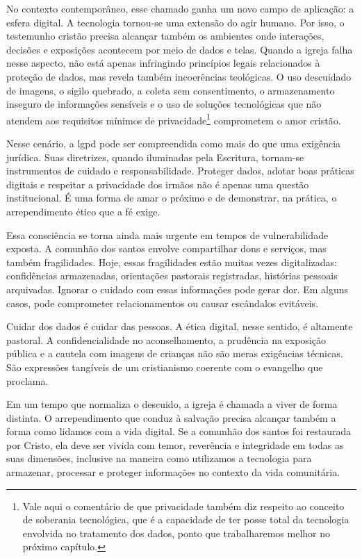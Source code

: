 No contexto contemporâneo, esse chamado ganha um novo campo de aplicação: a esfera digital. A tecnologia tornou-se uma extensão do agir humano. Por isso, o testemunho cristão precisa alcançar também os ambientes onde interações, decisões e exposições acontecem por meio de dados e telas. Quando a igreja falha nesse aspecto, não está apenas infringindo princípios legais relacionados à proteção de dados, mas revela também incoerências teológicas. O uso descuidado de imagens, o sigilo quebrado, a coleta sem consentimento, o armazenamento inseguro de informações sensíveis e o uso de soluções tecnológicas que não atendem aos requisitos mínimos de privacidade\footnote{Vale aqui o comentário de que privacidade também diz respeito ao conceito de soberania tecnológica, que é a capacidade de ter posse total da tecnologia envolvida no tratamento dos dados, ponto que trabalharemos melhor no próximo capítulo.} comprometem o amor cristão.

Nesse cenário, a \gls{lgpd} pode ser compreendida como mais do que uma exigência jurídica. Suas diretrizes, quando iluminadas pela Escritura, tornam-se instrumentos de cuidado e responsabilidade. Proteger dados, adotar boas práticas digitais e respeitar a privacidade dos irmãos não é apenas uma questão institucional. É uma forma de amar o próximo e de demonstrar, na prática, o arrependimento ético que a fé exige.

Essa consciência se torna ainda mais urgente em tempos de vulnerabilidade exposta. A comunhão dos santos envolve compartilhar dons e serviços, mas também fragilidades. Hoje, essas fragilidades estão muitas vezes digitalizadas: confidências armazenadas, orientações pastorais registradas, histórias pessoais arquivadas. Ignorar o cuidado com essas informações pode gerar dor. Em alguns casos, pode comprometer relacionamentos ou causar escândalos evitáveis.

Cuidar dos dados é cuidar das pessoas. A ética digital, nesse sentido, é altamente pastoral. A confidencialidade no aconselhamento, a prudência na exposição pública e a cautela com imagens de crianças não são meras exigências técnicas. São expressões tangíveis de um cristianismo coerente com o evangelho que proclama.

Em um tempo que normaliza o descuido, a igreja é chamada a viver de forma distinta. O arrependimento que conduz à salvação precisa alcançar também a forma como lidamos com a vida digital. Se a comunhão dos santos foi restaurada por Cristo, ela deve ser vivida com temor, reverência e integridade em todas as suas dimensões, inclusive na maneira como utilizamos a tecnologia para armazenar, processar e proteger informações no contexto da vida comunitária.

